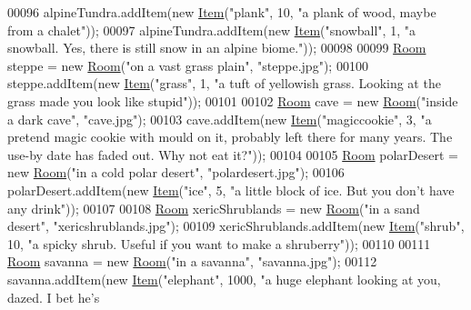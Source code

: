 \begin{DoxyCode}
00096         alpineTundra.addItem(\textcolor{keyword}{new} \hyperlink{classItem}{Item}(\textcolor{stringliteral}{"plank"}, 10, \textcolor{stringliteral}{"a plank of wood, maybe from a chalet"}));
00097         alpineTundra.addItem(\textcolor{keyword}{new} \hyperlink{classItem}{Item}(\textcolor{stringliteral}{"snowball"}, 1, \textcolor{stringliteral}{"a snowball. Yes, there is still snow in an alpine
       biome."}));
00098 
00099         \hyperlink{classRoom}{Room} steppe = \textcolor{keyword}{new} \hyperlink{classRoom}{Room}(\textcolor{stringliteral}{"on a vast grass plain"}, \textcolor{stringliteral}{"steppe.jpg"});
00100         steppe.addItem(\textcolor{keyword}{new} \hyperlink{classItem}{Item}(\textcolor{stringliteral}{"grass"}, 1, \textcolor{stringliteral}{"a tuft of yellowish grass. Looking at the grass made you
       look like stupid"}));
00101 
00102         \hyperlink{classRoom}{Room} cave = \textcolor{keyword}{new} \hyperlink{classRoom}{Room}(\textcolor{stringliteral}{"inside a dark cave"}, \textcolor{stringliteral}{"cave.jpg"});
00103         cave.addItem(\textcolor{keyword}{new} \hyperlink{classItem}{Item}(\textcolor{stringliteral}{"magiccookie"}, 3, \textcolor{stringliteral}{"a pretend magic cookie with mould on it, probably left
       there for many years. The use-by date has faded out. Why not eat it?"}));
00104 
00105         \hyperlink{classRoom}{Room} polarDesert = \textcolor{keyword}{new} \hyperlink{classRoom}{Room}(\textcolor{stringliteral}{"in a cold polar desert"}, \textcolor{stringliteral}{"polardesert.jpg"});
00106         polarDesert.addItem(\textcolor{keyword}{new} \hyperlink{classItem}{Item}(\textcolor{stringliteral}{"ice"}, 5, \textcolor{stringliteral}{"a little block of ice. But you don't have any drink"}));
00107 
00108         \hyperlink{classRoom}{Room} xericShrublands = \textcolor{keyword}{new} \hyperlink{classRoom}{Room}(\textcolor{stringliteral}{"in a sand desert"}, \textcolor{stringliteral}{"xericshrublands.jpg"});
00109         xericShrublands.addItem(\textcolor{keyword}{new} \hyperlink{classItem}{Item}(\textcolor{stringliteral}{"shrub"}, 10, \textcolor{stringliteral}{"a spicky shrub. Useful if you want to make a
       shruberry"}));
00110 
00111         \hyperlink{classRoom}{Room} savanna = \textcolor{keyword}{new} \hyperlink{classRoom}{Room}(\textcolor{stringliteral}{"in a savanna"}, \textcolor{stringliteral}{"savanna.jpg"});
00112         savanna.addItem(\textcolor{keyword}{new} \hyperlink{classItem}{Item}(\textcolor{stringliteral}{"elephant"}, 1000, \textcolor{stringliteral}{"a huge elephant looking at you, dazed. I bet he's
}
\end{DoxyCode}
